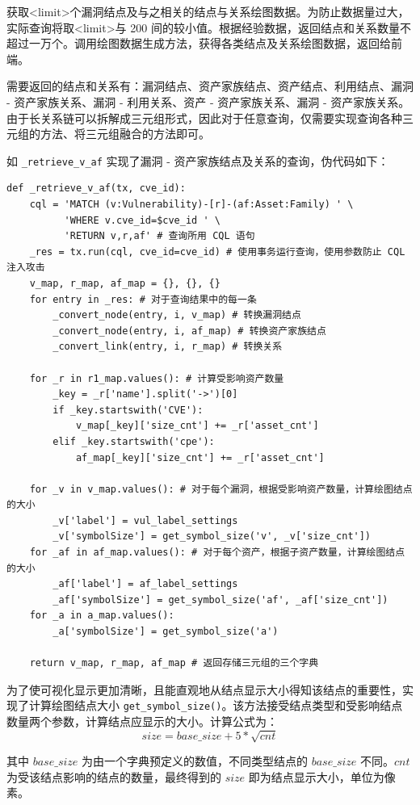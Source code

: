 \documentclass[a4paper,AutoFakeBold,oneside,12pt]{book}
\begin{document}
获取<limit>个漏洞结点及与之相关的结点与关系绘图数据。为防止数据量过大，实际查询将取<limit>与 200 间的较小值。根据经验数据，返回结点和关系数量不超过一万个。调用绘图数据生成方法，获得各类结点及关系绘图数据，返回给前端。

需要返回的结点和关系有：漏洞结点、资产家族结点、资产结点、利用结点、漏洞 - 资产家族关系、漏洞 - 利用关系、资产 - 资产家族关系、漏洞 - 资产家族关系。由于长关系链可以拆解成三元组形式，因此对于任意查询，仅需要实现查询各种三元组的方法、将三元组融合的方法即可。

如 \lstinline|_retrieve_v_af| 实现了漏洞 - 资产家族结点及关系的查询，伪代码如下：
\begin{lstlisting}[style=lgeneral]
def _retrieve_v_af(tx, cve_id):
	cql = 'MATCH (v:Vulnerability)-[r]-(af:Asset:Family) ' \
	      'WHERE v.cve_id=$cve_id ' \
	      'RETURN v,r,af' # 查询所用 CQL 语句
	_res = tx.run(cql, cve_id=cve_id) # 使用事务运行查询，使用参数防止 CQL 注入攻击
	v_map, r_map, af_map = {}, {}, {}
	for entry in _res: # 对于查询结果中的每一条
		_convert_node(entry, i, v_map) # 转换漏洞结点
		_convert_node(entry, i, af_map) # 转换资产家族结点
		_convert_link(entry, i, r_map) # 转换关系

	for _r in r1_map.values(): # 计算受影响资产数量
		_key = _r['name'].split('->')[0]
		if _key.startswith('CVE'):
			v_map[_key]['size_cnt'] += _r['asset_cnt']
		elif _key.startswith('cpe'):
			af_map[_key]['size_cnt'] += _r['asset_cnt']
	
	for _v in v_map.values(): # 对于每个漏洞，根据受影响资产数量，计算绘图结点的大小
		_v['label'] = vul_label_settings
		_v['symbolSize'] = get_symbol_size('v', _v['size_cnt'])
	for _af in af_map.values(): # 对于每个资产，根据子资产数量，计算绘图结点的大小
		_af['label'] = af_label_settings
		_af['symbolSize'] = get_symbol_size('af', _af['size_cnt'])
	for _a in a_map.values():
		_a['symbolSize'] = get_symbol_size('a')

	return v_map, r_map, af_map # 返回存储三元组的三个字典
\end{lstlisting}

为了使可视化显示更加清晰，且能直观地从结点显示大小得知该结点的重要性，实现了计算绘图结点大小 \lstinline|get_symbol_size()|。该方法接受结点类型和受影响结点数量两个参数，计算结点应显示的大小。计算公式为：
\begin{equation}
	size=base{\_}size+5*\sqrt{cnt}
\end{equation}

其中 $base{\_}size$ 为由一个字典预定义的数值，不同类型结点的 $base{\_}size$ 不同。$cnt$ 为受该结点影响的结点的数量，最终得到的 $size$ 即为结点显示大小，单位为像素。
\end{document}

